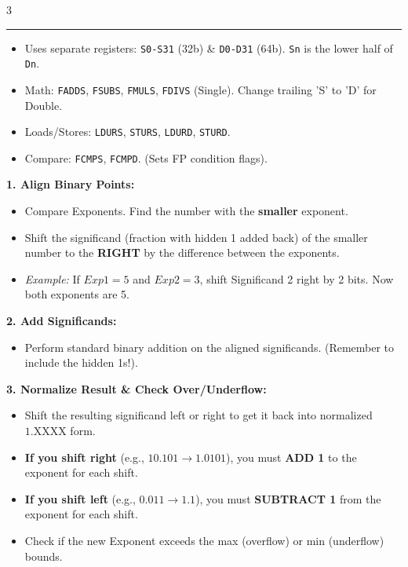 \documentclass[8pt, letterpaper]{extarticle}
\newcommand{\sectionhead}[1]{%
    \vspace{1.5mm}{\small\bfseries\uppercase{#1}}\vspace{0.2mm}\hrule\vspace{0.5mm}%
}
\begin{document}
\begin{multicols}{3}
\sectionhead{FP Instructions (LEGv8)}
\begin{itemize}
    \item Uses separate registers: \texttt{S0-S31} (32b) \& \texttt{D0-D31} (64b). \texttt{Sn} is the lower half of \texttt{Dn}.
    \item Math: \texttt{FADDS}, \texttt{FSUBS}, \texttt{FMULS}, \texttt{FDIVS} (Single). Change trailing 'S' to 'D' for Double.
    \item Loads/Stores: \texttt{LDURS}, \texttt{STURS}, \texttt{LDURD}, \texttt{STURD}.
    \item Compare: \texttt{FCMPS}, \texttt{FCMPD}. (Sets FP condition flags).
\end{itemize}

\begin{tcolorbox}[colback=yellow!5, colframe=black, boxrule=0.5pt, title=\textbf{Step-by-Step FP Addition}]
\textbf{1. Align Binary Points:} 
\begin{itemize}
    \item Compare Exponents. Find the number with the \textbf{smaller} exponent.
    \item Shift the significand (fraction with hidden 1 added back) of the smaller number to the \textbf{RIGHT} by the difference between the exponents.
    \item \textit{Example:} If $Exp1 = 5$ and $Exp2 = 3$, shift Significand 2 right by 2 bits. Now both exponents are 5.
\end{itemize}

\textbf{2. Add Significands:}
\begin{itemize}
    \item Perform standard binary addition on the aligned significands. (Remember to include the hidden 1s!).
\end{itemize}

\textbf{3. Normalize Result \& Check Over/Underflow:}
\begin{itemize}
    \item Shift the resulting significand left or right to get it back into normalized $1.\text{XXXX}$ form.
    \item \textbf{If you shift right} (e.g., $10.101 \to 1.0101$), you must \textbf{ADD 1} to the exponent for each shift.
    \item \textbf{If you shift left} (e.g., $0.011 \to 1.1$), you must \textbf{SUBTRACT 1} from the exponent for each shift.
    \item Check if the new Exponent exceeds the max (overflow) or min (underflow) bounds.
\end{itemize}


\end{tcolorbox}
\end{multicols}
\end{document}
